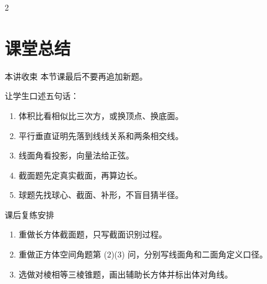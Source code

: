\documentclass[11pt,a4paper]{ctexart}
\newcommand{\topicteacherproblem}[2]{%
  \teachquestionheader{#1\quad #2}
}
\begin{document}
\newpage

\topicteacherproblem{提升}{对棱相等三棱锥与外接球}
{\small \qSolidIsoscelesTetrahedronStem}
\begin{center}
  \qSolidIsoscelesTetrahedronFigure[1.1]
\end{center}

\begin{paracol}{2}


\switchcolumn
{}

\end{paracol}

\section{课堂总结}

\begin{teachbox}{本讲收束}
本节课最后不要再追加新题。

让学生口述五句话：
\begin{enumerate}[label=\arabic*. , leftmargin=2em, itemsep=0.25em]
  \item 体积比看相似比三次方，或换顶点、换底面。
  \item 平行垂直证明先落到线线关系和两条相交线。
  \item 线面角看投影，向量法给正弦。
  \item 截面题先定真实截面，再算边长。
  \item 球题先找球心、截面、补形，不盲目猜半径。
\end{enumerate}
\end{teachbox}

\begin{teachbox}{课后复练安排}
\begin{enumerate}[label=\arabic*. , leftmargin=2em, itemsep=0.25em]
  \item 重做长方体截面题，只写截面识别过程。
  \item 重做正方体空间角题第 (2)(3) 问，分别写线面角和二面角定义口径。
  \item 选做对棱相等三棱锥题，画出辅助长方体并标出体对角线。
\end{enumerate}
\end{teachbox}
\end{document}
